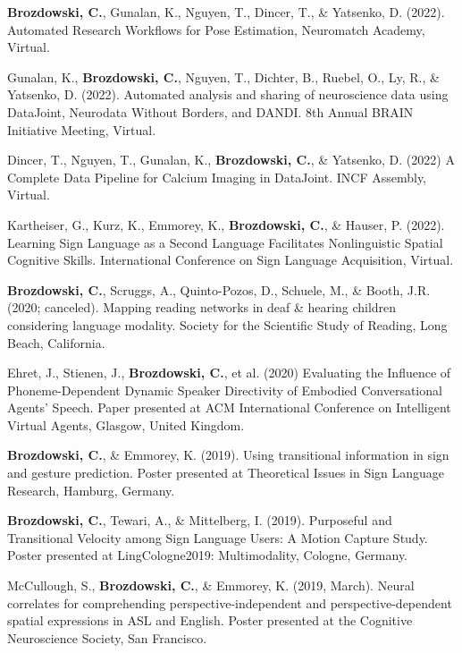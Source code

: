 \par
\begin{cvparagraphlist}
  \textbf{Brozdowski, C.}, Gunalan, K., Nguyen, T., Dincer, T., \& Yatsenko, D. (2022). Automated Research Workflows for Pose Estimation, Neuromatch Academy, Virtual. \par
  Gunalan, K., \textbf{Brozdowski, C.}, Nguyen, T., Dichter, B., Ruebel, O., Ly, R., \& Yatsenko, D. (2022). Automated analysis and sharing of neuroscience data using DataJoint, Neurodata Without Borders, and DANDI. 8th Annual BRAIN Initiative Meeting, Virtual. \par
  Dincer, T., Nguyen, T., Gunalan, K., \textbf{Brozdowski, C.}, \& Yatsenko, D. (2022) A Complete Data Pipeline for Calcium Imaging in DataJoint. INCF Assembly, Virtual. \par
  Kartheiser, G., Kurz, K., Emmorey, K., \textbf{Brozdowski, C.}, \& Hauser, P. (2022). Learning Sign Language as a Second Language Facilitates Nonlinguistic Spatial Cognitive Skills. International Conference on Sign Language Acquisition, Virtual. \par
  \textbf{Brozdowski, C.}, Scruggs, A., Quinto-Pozos, D., Schuele, M., \& Booth, J.R. (2020; canceled). Mapping reading networks in deaf \& hearing children considering language modality. Society for the Scientific Study of Reading, Long Beach, California. \par
  Ehret, J., Stienen, J., \textbf{Brozdowski, C.}, et al. (2020) Evaluating the Influence of Phoneme-Dependent Dynamic Speaker Directivity of Embodied Conversational Agents' Speech. Paper presented at ACM International Conference on Intelligent Virtual Agents, Glasgow, United Kingdom. \par
  \textbf{Brozdowski, C.}, \& Emmorey, K. (2019). Using transitional information in sign and gesture prediction. Poster presented at Theoretical Issues in Sign Language Research, Hamburg, Germany. \par
  \textbf{Brozdowski, C.}, Tewari, A., \& Mittelberg, I. (2019). Purposeful and Transitional Velocity among Sign Language Users: A Motion Capture Study. Poster presented at LingCologne2019: Multimodality, Cologne, Germany. \par
  McCullough, S., \textbf{Brozdowski, C.}, \& Emmorey, K. (2019, March). Neural correlates for comprehending perspective-independent and perspective-dependent spatial expressions in ASL and English. Poster presented at the Cognitive Neuroscience Society, San Francisco. \par

\end{cvparagraphlist}
